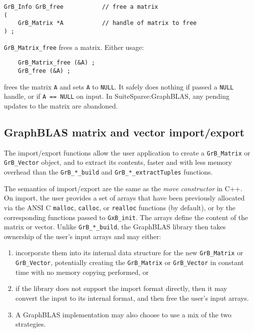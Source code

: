 \documentclass[12pt]{article}
\begin{document}
\begin{mdframed}[userdefinedwidth=6in]
{\footnotesize
\begin{verbatim}
GrB_Info GrB_free           // free a matrix
(
    GrB_Matrix *A           // handle of matrix to free
) ;
\end{verbatim} } \end{mdframed}

\verb'GrB_Matrix_free' frees a matrix.  Either usage:

    {\small
    \begin{verbatim}
    GrB_Matrix_free (&A) ;
    GrB_free (&A) ; \end{verbatim}}

\noindent
frees the matrix \verb'A' and sets \verb'A' to \verb'NULL'.  It safely does
nothing if passed a \verb'NULL' handle, or if \verb'A == NULL' on input.
In SuiteSparse:GraphBLAS, any pending updates to the matrix are abandoned.




\newpage
\subsection{GraphBLAS matrix and vector import/export} %
\label{import_export}

The import/export functions allow the user application to create a
\verb'GrB_Matrix' or \verb'GrB_Vector' object, and to extract its contents,
faster and with less memory overhead than the \verb'GrB_*_build' and
\verb'GrB_*_extractTuples' functions.

The semantics of import/export are the same as the {\em move constructor} in
C++.  On import, the user provides a set of arrays that have been previously
allocated via the ANSI C \verb'malloc', \verb'calloc', or \verb'realloc'
functions (by default), or by the corresponding functions passed to
\verb'GxB_init'.  The arrays define the content of the matrix or vector.
Unlike \verb'GrB_*_build', the GraphBLAS library then takes ownership of the
user's input arrays and may either:

\begin{enumerate}
\item incorporate them
into its internal data structure for the new \verb'GrB_Matrix' or
\verb'GrB_Vector', potentially creating the \verb'GrB_Matrix' or
\verb'GrB_Vector' in constant time with no memory copying performed, or
\item if
the library does not support the import format directly, then it may convert
the input to its internal format, and then free the user's input arrays.
\item A
GraphBLAS implementation may also choose to use a mix of the two strategies.
\end{enumerate}
\end{document}
